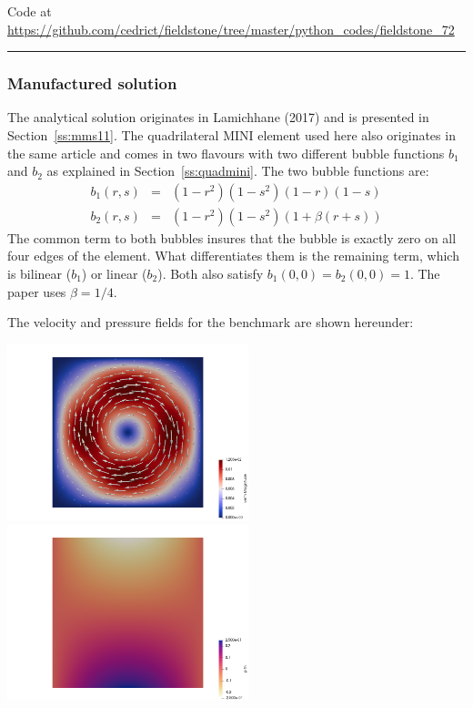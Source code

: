 

\begin{center}
Code at \url{https://github.com/cedrict/fieldstone/tree/master/python_codes/fieldstone_72}
\end{center}

\par\noindent\rule{\textwidth}{0.4pt}


\subsubsection*{Manufactured solution}

The analytical solution originates in Lamichhane (2017) \cite{lami17} and is 
presented in Section~\ref{ss:mms11}. 
The quadrilateral MINI element used here also originates in the same article 
and comes in two flavours with two different bubble functions $b_1$ and $b_2$
as explained in Section~\ref{ss:quadmini}.
The two bubble functions are:
\begin{eqnarray}
b_1(r,s) &=& (1-r^2)(1-s^2)(1-r)(1-s)\\
b_2(r,s) &=& (1-r^2)(1-s^2)(1+\beta(r+s))
\end{eqnarray}
The common term to both bubbles insures that the bubble is exactly zero on all four edges of the 
element. What differentiates them is the remaining term, which is bilinear ($b_1$) or linear ($b_2$). 
Both also satisfy $b_1(0,0)=b_2(0,0)=1$. The paper uses $\beta=1/4$.

The velocity and pressure fields for the benchmark are shown hereunder:
\begin{center}
\includegraphics[width=7cm]{python_codes/fieldstone_72/results/mms/vel}
\includegraphics[width=7cm]{python_codes/fieldstone_72/results/mms/p}
\end{center}

